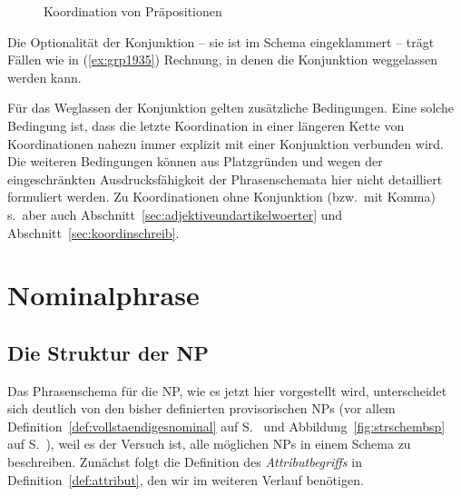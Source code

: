 \begin{figure}[!htbp]
  \centering
  \caption{Koordination von Präpositionen}
  \label{fig:koorpraep}
\end{figure}

Die Optionalität der Konjunktion -- sie ist im Schema eingeklammert -- trägt Fällen wie in (\ref{ex:grp1935}) Rechnung, in denen die Konjunktion weggelassen werden kann.\label{abs:koorohnekonj}

\begin{exe}
\end{exe}

Für das Weglassen der Konjunktion gelten zusätzliche Bedingungen.
Eine solche Bedingung ist, dass die letzte Koordination in einer längeren Kette von Koordinationen nahezu immer explizit mit einer Konjunktion verbunden wird.
Die weiteren Bedingungen können aus Platzgründen und wegen der eingeschränkten Ausdrucksfähigkeit der Phrasenschemata hier nicht detailliert formuliert werden.
Zu Koordinationen ohne Konjunktion (bzw.\ mit Komma) s.\ aber auch Abschnitt~\ref{sec:adjektiveundartikelwoerter} und Abschnitt~\ref{sec:koordinschreib}.



\section{Nominalphrase}

\label{sec:ngr}

\subsection{Die Struktur der NP}

Das Phrasenschema für die NP, wie es jetzt hier vorgestellt wird, unterscheidet sich deutlich von den bisher definierten provisorischen NPs (vor allem Definition~\ref{def:vollstaendigesnominal} auf S.~\pageref{def:vollstaendigesnominal} und Abbildung~\ref{fig:strschembsp} auf S.~\pageref{fig:strschembsp}), weil es der Versuch ist, alle möglichen NPs in einem Schema zu beschreiben.
Zunächst folgt die Definition des \textit{Attributbegriffs} in Definition~\ref{def:attribut}, den wir im weiteren Verlauf benötigen.

